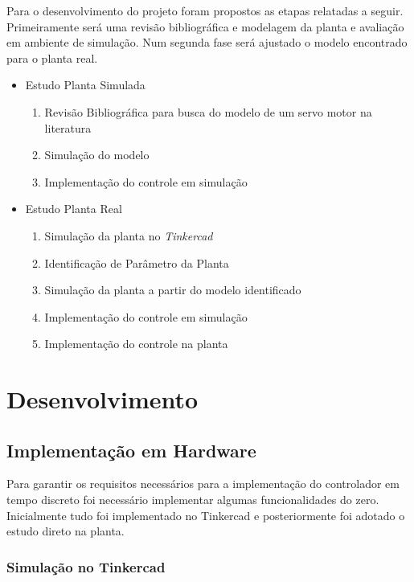 \documentclass[a4paper,11pt]{article}
\begin{document}
Para o desenvolvimento do projeto foram propostos as etapas relatadas a seguir. Primeiramente será uma revisão bibliográfica e modelagem da planta e avaliação em ambiente de simulação. Num segunda fase será ajustado o modelo encontrado para o planta real.

\begin{itemize}
    \item Estudo Planta Simulada
    \begin{enumerate}
        \item Revisão Bibliográfica para busca do modelo de um servo motor na literatura
        \item Simulação do modelo
        \item Implementação do controle em simulação
    \end{enumerate}
    \item Estudo Planta Real
    \begin{enumerate}
        \item Simulação da planta no \textit{Tinkercad}
        \item Identificação de Parâmetro da Planta
        \item Simulação da planta a partir do modelo identificado
        \item Implementação do controle em simulação
        \item Implementação do controle na planta
    \end{enumerate}
\end{itemize}

\section{Desenvolvimento}

\subsection{Implementação em Hardware}

Para garantir os requisitos necessários para a implementação do controlador em tempo discreto foi necessário implementar algumas funcionalidades do zero. Inicialmente tudo foi implementado no Tinkercad e posteriormente foi adotado o estudo direto na planta.

\subsubsection{Simulação no Tinkercad}
\end{document}
